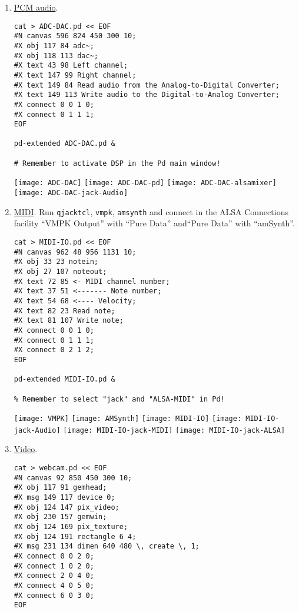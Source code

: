 \begin{enumerate}
\item \href{http://en.flossmanuals.net/pure-data/ch079_audio-glue/}{PCM audio}.
\begin{verbatim}
cat > ADC-DAC.pd << EOF
#N canvas 596 824 450 300 10;
#X obj 117 84 adc~;
#X obj 118 113 dac~;
#X text 43 98 Left channel;
#X text 147 99 Right channel;
#X text 149 84 Read audio from the Analog-to-Digital Converter;
#X text 149 113 Write audio to the Digital-to-Analog Converter;
#X connect 0 0 1 0;
#X connect 0 1 1 1;
EOF

pd-extended ADC-DAC.pd &

# Remember to activate DSP in the Pd main window!
\end{verbatim}

\begin{center}
  \texttt{[image: ADC-DAC]}
  \texttt{[image: ADC-DAC-pd]}
  \texttt{[image: ADC-DAC-alsamixer]}
  \texttt{[image: ADC-DAC-jack-Audio]}
\end{center}

\item
  \href{http://en.flossmanuals.net/pure-data/midi/using-midi/}{MIDI}. Run
  \texttt{qjacktcl}, \texttt{vmpk}, \texttt{amsynth} and connect in
  the ALSA Connections facility ``VMPK Output'' with ``Pure Data''
  and``Pure Data'' with ``amSynth''.
\begin{verbatim}
cat > MIDI-IO.pd << EOF
#N canvas 962 48 956 1131 10;
#X obj 33 23 notein;
#X obj 27 107 noteout;
#X text 72 85 <- MIDI channel number;
#X text 37 51 <------- Note number;
#X text 54 68 <---- Velocity;
#X text 82 23 Read note;
#X text 81 107 Write note;
#X connect 0 0 1 0;
#X connect 0 1 1 1;
#X connect 0 2 1 2;
EOF

pd-extended MIDI-IO.pd &

% Remember to select "jack" and "ALSA-MIDI" in Pd!
\end{verbatim}

\begin{center}
  \texttt{[image: VMPK]}
  \texttt{[image: AMSynth]}
  \texttt{[image: MIDI-IO]}
  \texttt{[image: MIDI-IO-jack-Audio]}
  \texttt{[image: MIDI-IO-jack-MIDI]}
  \texttt{[image: MIDI-IO-jack-ALSA]}
\end{center}

\item \href{http://en.flossmanuals.net/pure-data/ch049_moving-images/}{Video}.
\begin{verbatim}
cat > webcam.pd << EOF
#N canvas 92 850 450 300 10;
#X obj 117 91 gemhead;
#X msg 149 117 device 0;
#X obj 124 147 pix_video;
#X obj 230 157 gemwin;
#X obj 124 169 pix_texture;
#X obj 124 191 rectangle 6 4;
#X msg 231 134 dimen 640 480 \, create \, 1;
#X connect 0 0 2 0;
#X connect 1 0 2 0;
#X connect 2 0 4 0;
#X connect 4 0 5 0;
#X connect 6 0 3 0;
EOF


\end{verbatim}
\end{enumerate}
